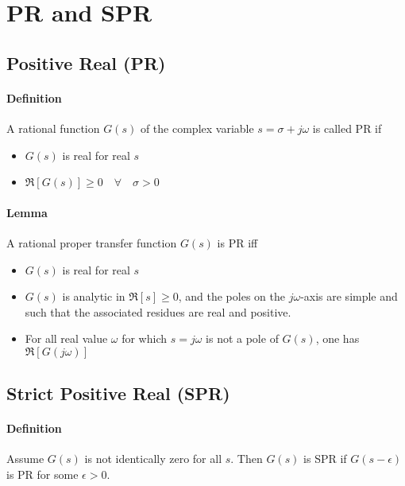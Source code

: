 \section{PR and SPR}

\subsection{Positive Real (PR)}
\paragraph{Definition}
A rational function $G(s)$ of the complex variable $s=\sigma + j\omega$ is called PR if
\begin{itemize}
	\item $G(s)$ is real for real $s$
	\item $\Re[G(s)] \geq 0 \quad \forall \quad \sigma > 0$
\end{itemize}

\paragraph{Lemma}
A rational proper transfer function $G(s)$ is PR iff
\begin{itemize}
	\item $G(s)$ is real for real $s$
	\item $G(s)$ is analytic in $\Re[s] \geq 0$, and the poles on the $j\omega$-axis are simple and such that the associated residues are real and positive.
	\item For all real value $\omega$ for which $s = j \omega$ is not a pole of $G(s)$, one has $\Re[G(j\omega)]$
\end{itemize}

\subsection{Strict Positive Real (SPR)}
\paragraph{Definition} Assume $G(s)$ is not identically zero for all $s$. Then $G(s)$ is SPR if $G(s-\epsilon)$ is PR for some $\epsilon > 0$.


